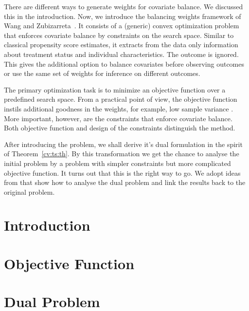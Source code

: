 There are different ways
to generate weights for covariate balance.
%
We discussed this in the introduction.
%
Now, we introduce the balancing weights framework of Wang and Zubizarreta~\cite{Wang2019}.
%
It consists of a (generic) convex optimization problem
that enforces covariate balance by constraints on the search space.
%
Similar to classical propensity score estimates, it
extracts from the data only information about treatment status and individual characteristics.
%
The outcome is ignored.
%
This gives the additional option to balance covariates before observing outcomes or use the same set of weights for inference on different outcomes.

%
The primary optimization task is to minimize an objective function
over a predefined search space.
%
From a practical point of view, the objective function
instils additional goodness in the weights, 
for example, 
low sample variance \cite[Introduction]{Zubizarreta2015}. 
%
%
More important, however, are the constraints that enforce covariate balance.
%
Both objective function and design of the constraints distinguish the method.
%

After introducing the problem, we shall derive it's dual formulation in the spirit of Theorem~\ref{cv:ts:th}.
By this transformation we get the chance to analyse the initial problem by a problem with simpler constraints but more complicated objective function.
It turns out that this is the right way to go.
We adopt ideas from \cite{Wang2019, Tseng1991} that show how to analyse the dual problem and link the results back to the original problem. 
\section{Introduction}


\section{Objective Function}

\section{Dual Problem}




%
%

